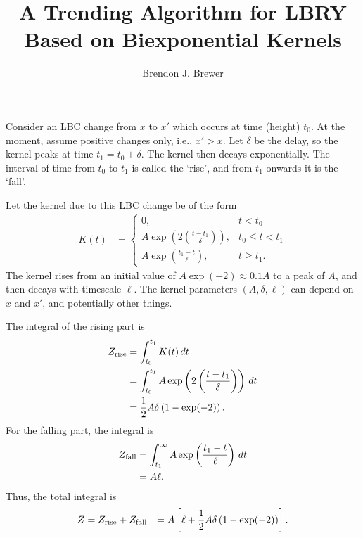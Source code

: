 \documentclass[a4paper, 12pt]{article}
\title{A Trending Algorithm for LBRY Based on Biexponential Kernels}
\author{Brendon J. Brewer}
\date{}
\begin{document}
\maketitle


\setlength{\parindent}{0pt}
\setlength{\parskip}{8pt}

Consider an LBC change from $x$ to $x'$ which occurs at time (height) $t_0$.
At the moment, assume positive changes only, i.e., $x' > x$.
Let $\delta$ be the delay, so the kernel peaks at time $t_1 = t_0 + \delta$.
The kernel then decays exponentially. The interval
of time from $t_0$ to $t_1$ is called the `rise', and from $t_1$ onwards it is
the `fall'.

Let the kernel due to this LBC change be of the form
\begin{align}
K(t) &=
    \left\{
        \begin{array}{lr}
            0, & t < t_0 \\
            A\exp\left(2\left(\frac{t - t_1}{\delta}\right)\right),
                                                & t_0 \leq t < t_1 \\
            A\exp\left(\frac{t_1 - t}{\ell}  \right),  & t \geq t_1.
        \end{array}
    \right.
\end{align}
The kernel rises from an initial value of $A\exp(-2) \approx 0.1A$ to a peak
of $A$, and then decays with timescale $\ell$. The kernel parameters
$(A, \delta, \ell)$ can depend on $x$ and $x'$, and potentially other things.

The integral of the rising part is
\begin{align}
Z_{\rm rise}
    &= \int_{t_0}^{t_1} K(t) \, dt \\
    &= \int_{t_0}^{t_1} A\exp\left(2\left(\frac{t - t_1}{\delta}\right)\right)\, dt\\
    &= \frac{1}{2}A\delta\left(1 - \exp(-2)\right).
\end{align}
For the falling part, the integral is
\begin{align}
Z_{\rm fall}
    &= \int_{t_1}^{\infty} A\exp\left(\frac{t_1 - t}{\ell}  \right) \, dt \\
    &= A\ell.
\end{align}
Thus, the total integral is
\begin{align}
Z &= Z_{\rm rise} + Z_{\rm fall}
  &= A\left[\ell + \frac{1}{2}A\delta\left(1 - \exp(-2)\right)\right].
\end{align}
\end{document}
